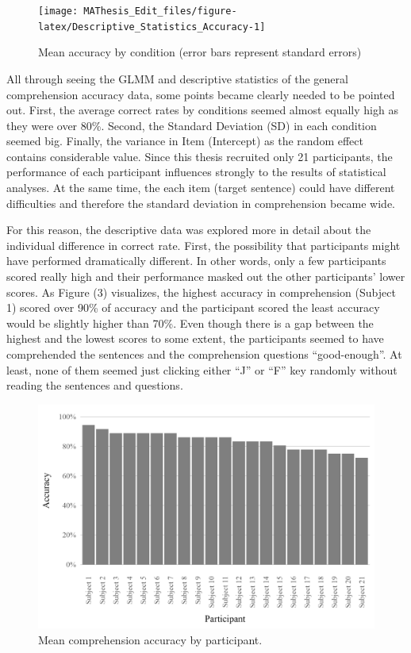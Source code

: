 \documentclass[
]{article}
\begin{document}
\begin{figure}

{\centering \texttt{[image: MAThesis\_Edit\_files/figure-latex/Descriptive\_Statistics\_Accuracy-1]} 

}

\caption{Mean accuracy by condition (error bars represent standard errors)}\label{fig:Descriptive_Statistics_Accuracy}
\end{figure}

\clearpage

All through seeing the GLMM and descriptive statistics of the general
comprehension accuracy data, some points became clearly needed to be
pointed out. First, the average correct rates by conditions seemed
almost equally high as they were over 80\%. Second, the Standard
Deviation (SD) in each condition seemed big. Finally, the variance in
Item (Intercept) as the random effect contains considerable value. Since
this thesis recruited only 21 participants, the performance of each
participant influences strongly to the results of statistical analyses.
At the same time, the each item (target sentence) could have different
difficulties and therefore the standard deviation in comprehension
became wide.

For this reason, the descriptive data was explored more in detail about
the individual difference in correct rate. First, the possibility that
participants might have performed dramatically different. In other
words, only a few participants scored really high and their performance
masked out the other participants' lower scores. As Figure (3)
visualizes, the highest accuracy in comprehension (Subject 1) scored
over 90\% of accuracy and the participant scored the least accuracy
would be slightly higher than 70\%. Even though there is a gap between
the highest and the lowest scores to some extent, the participants
seemed to have comprehended the sentences and the comprehension
questions ``good-enough''. At least, none of them seemed just clicking
either ``J'' or ``F'' key randomly without reading the sentences and
questions.

\begin{figure}

{\centering \includegraphics[width=0.8\linewidth]{comprehension_accuracy_by_participant} 

}

\caption{Mean comprehension accuracy by participant.}\label{fig:load_image}
\end{figure}
\end{document}
